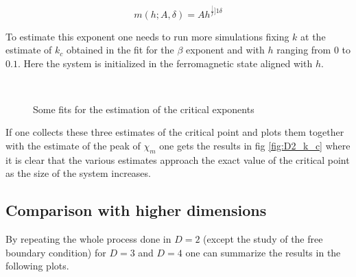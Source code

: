 \documentclass[a4paper, 11pt]{article}
\begin{document}
    \begin{equation}
      m(h;A,\delta) = Ah^{\frac[f]{1}{\delta}}
    \end{equation}

    To estimate this exponent one needs to run more simulations fixing $k$ at the estimate of $k_c$ obtained in the fit for the $\beta$ exponent and with $h$ ranging from $0$ to $0.1$. Here the system is initialized in the ferromagnetic state aligned with $h$.

    \begin{figure}[H]
      \centering
      \begin{subfigure}[Fit of the specific heat: estimation of $\alpha_1$, $\alpha_2$.]{
        \label{fig:D2_alpha}}
      \end{subfigure}
      \begin{subfigure}[Fit of the magnetization with respect to $k$ at $h = 0$: estimation of $\beta$.]{
        \label{fig:D2_beta}}
      \end{subfigure}\\
      \begin{subfigure}[Fit of the magnetic susceptibility: estimation of $\gamma_1$, $\gamma_2$.]{
        \label{fig:D2_gamma}}
      \end{subfigure}
      \begin{subfigure}[Fit of the magnetization with respect to $h$ at $k = k_c$: estimation of $\delta$.]{
        \label{fig:D2_delta}}
      \end{subfigure}
      \caption{Some fits for the estimation of the critical exponents}
    \end{figure}

    If one collects these three estimates of the critical point and plots them together with the estimate of the peak of $\chi_m$ one gets the results in fig \ref{fig:D2_k_c} where it is clear that the various estimates approach the exact value of the critical point as the size of the system increases.


  \subsection{Comparison with higher dimensions}
    By repeating the whole process done in $D=2$ (except the study of the free boundary condition) for $D = 3$ and $D = 4$ one can summarize the results in the following plots.
\end{document}
